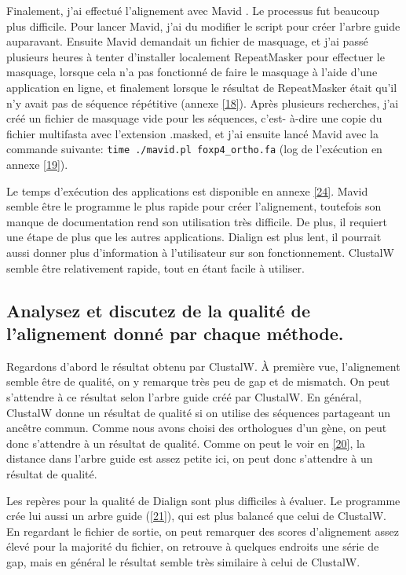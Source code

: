 \documentclass[10.9pt]{article} %
\begin{document}
Finalement, j'ai effectué l'alignement avec Mavid \cite{Mavid}. Le processus fut beaucoup plus difficile. 
Pour lancer Mavid, j'ai du modifier le script pour créer l'arbre guide auparavant. Ensuite
Mavid demandait un fichier de masquage, et j'ai passé plusieurs heures à tenter d'installer
localement RepeatMasker \cite{RepeatMasker} pour effectuer le masquage, lorsque cela n'a pas fonctionné de
faire le masquage à l'aide d'une application en ligne, et finalement lorsque le résultat
de RepeatMasker était qu'il n'y avait pas de séquence répétitive (annexe \ref{18}).
Après plusieurs recherches, j'ai créé un fichier de masquage vide pour les séquences, c'est-
à-dire une copie du fichier multifasta avec l'extension .masked, et j'ai ensuite lancé Mavid avec
la commande suivante: \texttt{time ./mavid.pl foxp4\_ortho.fa} (log de l'exécution en annexe \ref{19}).

Le temps d'exécution des applications est disponible en annexe \ref{24}. Mavid semble 
être le programme le plus rapide pour créer l'alignement, toutefois son manque de 
documentation rend son utilisation très difficile. De plus, il requiert une étape de
plus que les autres applications. Dialign est plus lent, il pourrait aussi donner plus
d'information à l'utilisateur sur son fonctionnement. ClustalW semble être relativement
rapide, tout en étant facile à utiliser.

\subsection[Qualité des alignements]{Analysez et discutez de la qualité de l'alignement donné par chaque méthode.}

Regardons d'abord le résultat obtenu par ClustalW. À première vue, l'alignement semble être
de qualité, on y remarque très peu de gap et de mismatch. On peut s'attendre
à ce résultat selon l'arbre guide créé par ClustalW. En général, ClustalW donne un résultat de
qualité si on utilise des séquences partageant un ancêtre commun. Comme nous avons choisi des
orthologues d'un gène, on peut donc s'attendre à un résultat de qualité. Comme on peut le voir en
\ref{20}, la distance dans l'arbre guide est assez petite ici, on peut donc s'attendre à un
résultat de qualité.

Les repères pour la qualité de Dialign sont plus difficiles à évaluer. Le programme crée lui
aussi un arbre guide (\ref{21}), qui est plus balancé que celui de ClustalW. 
En regardant le fichier de sortie, on peut remarquer des scores d'alignement assez élevé pour la
majorité du fichier, on retrouve à quelques endroits une série de gap, mais en général le résultat
semble très similaire à celui de ClustalW.
\end{document}
